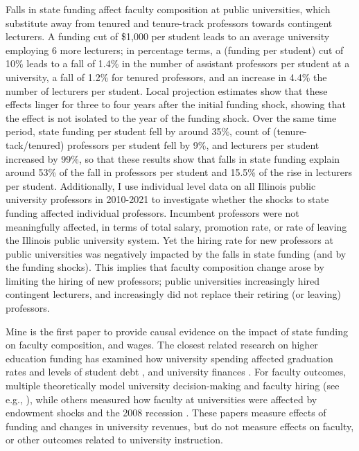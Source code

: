 Falls in state funding affect faculty composition at public universities, which substitute away from tenured and tenure-track professors towards contingent lecturers.
A funding cut of \$1,000 per student leads to an average university employing 6 more lecturers;
in percentage terms, a (funding per student) cut of 10\% leads to a fall of 1.4\% in the number of assistant professors per student at a university, a fall of 1.2\% for tenured professors, and an increase in 4.4\% the number of lecturers per student.
Local projection estimates show that these effects linger for three to four years after the initial funding shock, showing that the effect is not isolated to the year of the funding shock. 
Over the same time period, state funding per student fell by around 35\%, count of (tenure-tack/tenured) professors per student fell by 9\%, and lecturers per student increased by 99\%, so that these results show that falls in state funding explain around 53\% of the fall in professors per student
and 15.5\% of the rise in lecturers per student.
Additionally, I use individual level data on all Illinois public university professors in 2010-2021 to investigate whether the shocks to state funding affected individual professors.
Incumbent professors were not meaningfully affected, in terms of total salary, promotion rate, or rate of leaving the Illinois public university system.
Yet the hiring rate for new professors at public universities was negatively impacted by the falls in state funding (and by the funding shocks).
This implies that faculty composition change arose by limiting the hiring of new professors; public universities increasingly hired contingent lecturers, and increasingly did not replace their retiring (or leaving) professors.

Mine is the first paper to provide causal evidence on the impact of state funding on faculty composition, and wages.
The closest related research on higher education funding has examined how university spending affected graduation rates and levels of student debt \citep{NBERw23736,NBERw27885}, and university finances \citep{miller2022making,bound2019public,brown2014endowment}.
For faculty outcomes, multiple theoretically model university decision-making and faculty hiring (see e.g., \citealt{abe2015implications,johnson2009jep,NBERc13879}), while others measured how faculty at universities were affected by endowment shocks and the 2008 recession \citep{brown2014endowment,turner2014impact}.
These papers measure effects of funding and changes in university revenues, but do not measure effects on faculty, or other outcomes related to university instruction.

